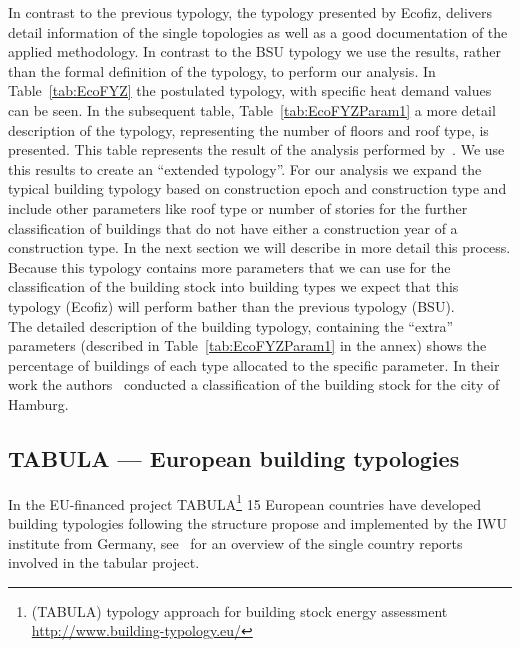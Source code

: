 \documentclass[authoryear,preprint,review,12pt]{elsarticle}
\begin{document}
\begin{linenumbers}
In contrast to the previous typology, the typology presented by Ecofiz,
delivers detail information of the single topologies as well as a good
documentation of the applied methodology.  In contrast to the BSU typology we
use the results, rather than the formal definition of the typology, to perform
our analysis.  In Table~\ref{tab:EcoFYZ} the postulated typology, with specific
heat demand values can be seen.  In the subsequent table,
Table~\ref{tab:EcoFYZParam1} a more detail description of the typology,
representing the number of floors and roof type, is presented.  This table
represents the result of the analysis performed by~\citeauthor{Hermelink.2011}.
We use this results to create an ``extended typology''.  For our analysis we
expand the typical building typology based on construction epoch and
construction type and include other parameters like roof type or number of
stories for the further classification of buildings that do not have either a
construction year of a construction type.  In the next section we will describe
in more detail this process.  Because this typology contains more parameters
that we can use for the classification of the building stock into building
types we expect that this typology (Ecofiz) will perform bather than the
previous typology (BSU).\\

The detailed description of the building typology, containing the ``extra''
parameters (described in Table~\ref{tab:EcoFYZParam1} in the annex) shows the percentage of
buildings of each type allocated to the specific parameter.  In their work the
authors~\citet{Hermelink.2011} conducted a classification of the building stock
for the city of Hamburg.\\ 



\subsection{TABULA --- European building typologies}\label{sub-sec:tabular}

In the EU-financed project TABULA\footnote{(TABULA) typology approach for
    building stock energy assessment \url{http://www.building-typology.eu/}}
15 European countries have developed building typologies following the
structure propose and implemented by the IWU institute from Germany,
see~\cite{TABULAProjectTeam.2012c} for an overview of the single country
reports involved in the tabular project.\\


\end{linenumbers}
\end{document}
